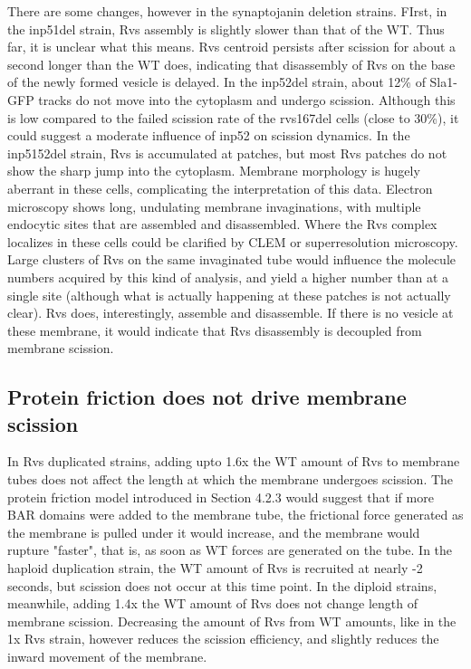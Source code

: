 There are some changes, however in the synaptojanin deletion strains. FIrst, in the inp51del strain, Rvs assembly is slightly slower than that of the WT. Thus far, it is unclear what this means. Rvs centroid persists after scission for about a second longer than the WT does, indicating that disassembly of Rvs on the base of the newly formed vesicle is delayed. In the inp52del strain, about 12\% of Sla1-GFP tracks do not move into the cytoplasm and undergo scission. Although this is low compared to the failed scission rate of the rvs167del cells (close to 30\%), it could suggest a moderate influence of inp52 on scission dynamics. In the inp5152del strain, Rvs is accumulated at patches, but most Rvs patches do not show the sharp jump into the cytoplasm. Membrane morphology is hugely aberrant in these cells, complicating the interpretation of this data. 
Electron microscopy shows long, undulating membrane invaginations, with multiple endocytic sites that are assembled and disassembled. Where the Rvs complex localizes in these cells could be clarified by CLEM or superresolution microscopy. Large clusters of Rvs on the same invaginated tube would influence the molecule numbers acquired by this kind of analysis, and yield a higher number than at a single site (although what is actually happening at these patches is not actually clear). Rvs does, interestingly, assemble and disassemble. If there is no vesicle at these membrane, it would indicate that Rvs disassembly is decoupled from membrane scission.


\subsection{Protein friction does not drive membrane scission}
In Rvs duplicated strains, adding upto 1.6x the WT amount of Rvs to membrane tubes does not affect the length at which the membrane undergoes scission. The protein friction model introduced in Section 4.2.3 would suggest that if more BAR domains were added to the membrane tube, the frictional force generated as the membrane is pulled under it would increase, and the membrane would rupture "faster", that is, as soon as WT forces are generated on the tube. In the haploid duplication strain, the WT amount of Rvs is recruited at nearly -2 seconds, but scission does not occur at this time point. In the diploid strains, meanwhile, adding 1.4x the WT amount of Rvs does not change length of membrane scission. Decreasing the amount of Rvs from WT amounts, like in the 1x Rvs strain, however reduces the scission efficiency, and slightly reduces the inward movement of the membrane. 

